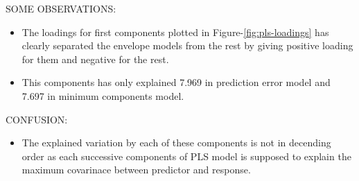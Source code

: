 \documentclass[12pt,3p,authoryear]{elsarticle}
\providecommand{\tightlist}{%
  \setlength{\itemsep}{0pt}\setlength{\parskip}{0pt}}
\theoremstyle{definition}
\theoremstyle{definition}
\theoremstyle{definition}
\theoremstyle{remark}
\begin{document}
SOME OBSERVATIONS:

\begin{itemize}
\tightlist
\item
  The loadings for first components plotted in
  Figure-\ref{fig:pls-loadings} has clearly separated the envelope
  models from the rest by giving positive loading for them and negative
  for the rest.
\item
  This components has only explained 7.969 in prediction error model and
  7.697 in minimum components model.
\end{itemize}

CONFUSION:

\begin{itemize}
\tightlist
\item
  The explained variation by each of these components is not in
  decending order as each successive components of PLS model is supposed
  to explain the maximum covarinace between predictor and response.
\end{itemize}

\hypertarget{refs}{}

\appendix



\renewcommand\refname{References}

\end{document}
